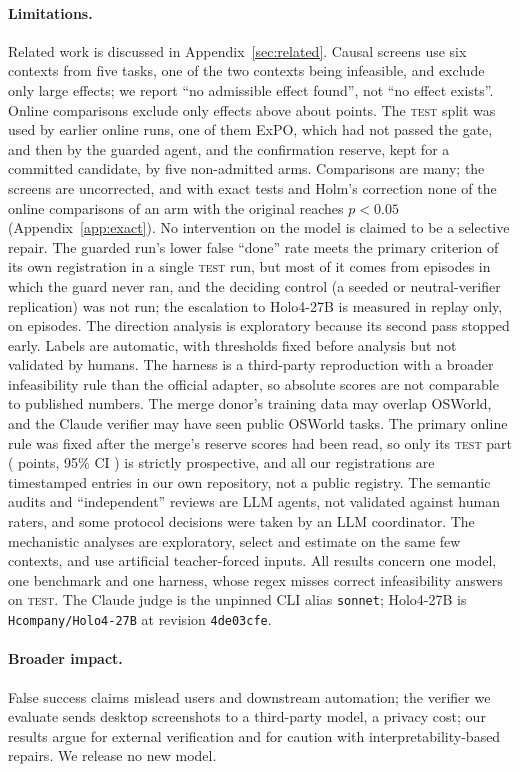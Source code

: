 \paragraph{Limitations.} Related work is discussed in Appendix~\ref{sec:related}. Causal screens use six contexts from five tasks, one of the two \fsp{} contexts being infeasible, and exclude only large effects; we report ``no admissible effect found'', not ``no effect exists''. Online comparisons exclude only effects above about \onMde{} points. The \textsc{test} split was used by \onNTestRuns{} earlier online runs, one of them ExPO, which had not passed the gate, and then by the guarded agent, and the confirmation reserve, kept for a committed candidate, by five non-admitted arms. Comparisons are many; the screens are uncorrected, and with exact tests and Holm's correction none of the \exHolmOnlineN{} online comparisons of an arm with the original reaches $p<0.05$ (Appendix~\ref{app:exact}). No intervention on the model is claimed to be a selective repair. The guarded run's lower false ``done'' rate meets the primary criterion of its own registration in a single \textsc{test} run, but most of it comes from episodes in which the guard never ran, and the deciding control (a seeded or neutral-verifier replication) was not run; the escalation to Holo4-27B is measured in replay only, on \rbPrimEpisodes{} episodes. The direction analysis is exploratory because its second pass stopped early. Labels are automatic, with thresholds fixed before analysis but not validated by humans. The harness is a third-party reproduction with a broader infeasibility rule than the official adapter, so absolute scores are not comparable to published numbers. The merge donor's training data may overlap OSWorld, and the Claude verifier may have seen public OSWorld tasks. The primary online rule was fixed after the merge's reserve scores had been read, so only its \textsc{test} part (\onTestCuaDelta{} points, 95\% CI \onTestCuaCi) is strictly prospective, and all our registrations are timestamped entries in our own repository, not a public registry. The semantic audits and ``independent'' reviews are LLM agents, not validated against human raters, and some protocol decisions were taken by an LLM coordinator. The mechanistic analyses are exploratory, select and estimate on the same few contexts, and use artificial teacher-forced inputs. All results concern one model, one benchmark and one harness, whose regex misses \cdRegex{} correct infeasibility answers on \textsc{test}. The Claude judge is the unpinned CLI alias \texttt{sonnet}; Holo4-27B is \texttt{Hcompany/Holo4-27B} at revision \texttt{4de03cfe}.

\paragraph{Broader impact.} False success claims mislead users and downstream automation; the verifier we evaluate sends desktop screenshots to a third-party model, a privacy cost; our results argue for external verification and for caution with interpretability-based repairs. We release no new model.
